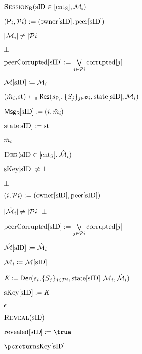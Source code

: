 \begin{figure}[h!]
{{\begin{minipage}[t]{7.5cm}
				\underline{$\GakeResO(\sID \in [\cntS], \GakeIniMesSet[{i}] )$} %
				\begin{nicodemus}
					\item $(\GIni,\PartySet{i}) := (\owner[\sID],\peer[\sID])$
					\item \pcif $|\GakeIniMesSet[{i}]| \neq |\PartySet{i}|$ 
					\item \quad  \pcreturn $\bot$ 
					\item $\peercorrupted[\sID] := \bigvee\limits_{ j \in \PartySet{i}} \corrupted[j]$
					\item $\GIniMesSet[\sID] \coloneqq  \GakeIniMesSet[{i}]$ \label{line:gake-problem-a}
					\item $(\GakeResMes_{i}, \Gstate) \getsr \GakeRes(\GakeSk[\GIni], \{\GakePk[j]\}_{j \in \PartySet{i}}, \Gstates[\GakeResUsID], \GakeIniMesSet[{i}])$
					\item $\GResMes[\sID]:=({i},\GakeResMes_{i})$
					\item $\Gstates[\sID]:= \Gstate$
					\item \pcreturn $\GakeResMes_{i}$ 
				\end{nicodemus}
			\end{minipage}
			\begin{minipage}[t]{7cm}
				\underline{$\GakeDerO(\GakeResUsID \in [\cntS],  \GakeResMesSet[{i}])$} 
				\begin{nicodemus}
					\item \pcif $\skeys[\GakeResUsID] \neq \bot$  
					\item \quad \pcreturn $\bot$
					\item $({i},\PartySet{i}) := (\owner[\GakeResUsID],\peer[\GakeResUsID])$
					\item \pcif $|\GakeResMesSet[{i}]| \neq |\PartySet{i}|$ \pcreturn $\bot$
					\item $\peercorrupted[\sID] := \bigvee\limits_{ j \in \PartySet{i}} \corrupted[j]$
					\item $\GResMesSet[\sID] \coloneqq \GakeResMesSet[{i}]$ \label{line:gake-problem-b}
					\item $\GakeIniMesSet[{i}] \coloneqq \GIniMesSet[\sID]$
					\item $\GakeSessKey \coloneqq \GakeDer(\GakeSk[{i}], \{\GakePk[j]\}_{j \in \PartySet{i}}, \Gstates[\GakeResUsID], \GakeIniMesSet[{i}], \GakeResMesSet[{i}])$
					\item $\skeys[\GakeResUsID] :=  \GakeSessKey$
					\item \pcreturn $\emptystr$\\
				\end{nicodemus}
				\underline{$\RevealO(\sID)$}
				\begin{nicodemus}
					\item $\revealed[\sID] \coloneqq \true$
					\item $\pcreturn \skeys[\sID]$	\\	
				\end{nicodemus}
				

\end{minipage}}}
\end{figure}
